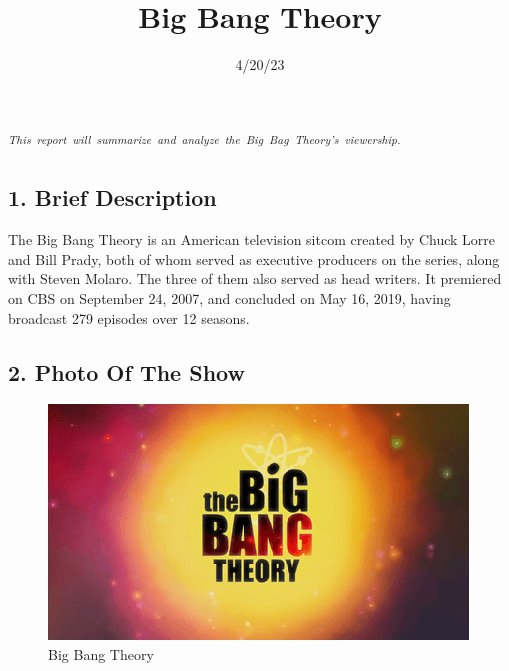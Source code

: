 \documentclass[
  letterpaper,
  DIV=11,
  numbers=noendperiod]{scrartcl}
\title{Big Bang Theory}
\author{}
\date{4/20/23}
\begin{document}
\maketitle
\ifdefined\Shaded\renewenvironment{Shaded}{\begin{tcolorbox}[borderline west={3pt}{0pt}{shadecolor}, breakable, sharp corners, boxrule=0pt, interior hidden, enhanced, frame hidden]}{\end{tcolorbox}}\fi

\listoffigures
\listoftables
\textsuperscript{\emph{This~report~will~summarize~and~analyze~the~Big~Bag~Theory's~viewership.}}

\hypertarget{brief-description}{%
\subsection{1. Brief Description}\label{brief-description}}

The Big Bang Theory is an American television sitcom created by Chuck
Lorre and Bill Prady, both of whom served as executive producers on the
series, along with Steven Molaro. The three of them also served as head
writers. It premiered on CBS on September 24, 2007, and concluded on May
16, 2019, having broadcast 279 episodes over 12 seasons.

\hypertarget{photo-of-the-show}{%
\subsection{2. Photo Of The Show}\label{photo-of-the-show}}

\begin{figure}

{\centering \includegraphics{The_Big_Bang_Theory.png}

}

\caption{Big Bang Theory}

\end{figure}
\end{document}
